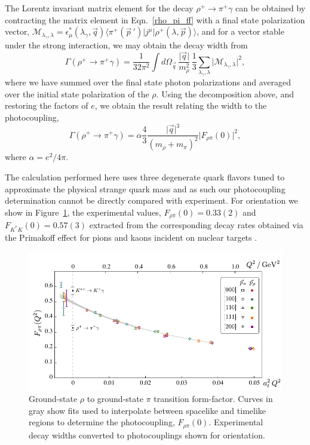 \documentclass[twocolumn,amsmath,amssymb,prd,10pt,floatfix, 
superscriptaddress,nofootinbib, showpacs, preprintnumbers]{revtex4-1}
\begin{document}
The Lorentz invariant matrix element for the decay $\rho^+ \to \pi^+ \gamma$ can be obtained by contracting the matrix element in Eqn.~\ref{rho_pi_ff} with a final state polarization vector, $\mathcal{M}_{\lambda_\gamma,\lambda} = \epsilon^*_\mu(\lambda_\gamma,\vec{q}) \big\langle \pi^+(\vec{p}\,') \big| j^\mu \big| \rho^+(\lambda, \vec{p}) \big\rangle$,
and for a vector stable under the strong interaction, we may obtain the decay width from
\begin{equation*}
\Gamma(\rho^+\rightarrow \pi^+\gamma) = \frac{1}{32\pi^2}\int \!\! d\Omega_{\vec{q}} \, \frac{\lvert \vec{q}\rvert}{m_\rho^2} \,  \frac{1}{3} \sum_{\lambda_\gamma,\lambda} \lvert \mathcal{M}_{\lambda_\gamma,\lambda}  \rvert^2,
\end{equation*}
where we have summed over the final state photon polarizations and averaged over the initial state polarization of the $\rho$. Using the decomposition above, and restoring the factors of $e$, we obtain the result relating the width to the photocoupling,
\begin{equation*}
\Gamma(\rho^+\rightarrow \pi^+\gamma) = \alpha\frac{4}{3} \frac{\lvert \vec{q} \rvert^3}{(m_\rho \!+\! m_\pi)^2} \lvert F_{\rho \pi}(0) \rvert^2,
\end{equation*}
where $\alpha = e^2/4\pi$. 

The calculation performed here uses three degenerate quark flavors tuned to approximate the physical strange quark mass and as such our photocoupling determination cannot be directly compared with experiment. For orientation we show in Figure~\ref{fig::rho_pi_transition}, the experimental values, $F_{\rho \pi}(0) = 0.33(2)$ and $F_{K^{\!*}\!K}(0) = 0.57(3)$ extracted from the corresponding decay rates obtained via the Primakoff effect for pions and kaons incident on nuclear targets \cite{PhysRevD.33.3199,Capraro:1987rp,PhysRevLett.51.168}.


\begin{figure}
  \includegraphics[width=0.71\linewidth]{fig18.pdf}
  \caption{Ground-state $\rho$ to ground-state $\pi$ transition form-factor. Curves in gray show fits used to interpolate between spacelike and timelike regions to determine the photocoupling, $F_{\rho\pi}(0)$. Experimental decay widths converted to photocouplings shown for orientation.  \label{fig::rho_pi_transition}}
\end{figure}
\end{document}
